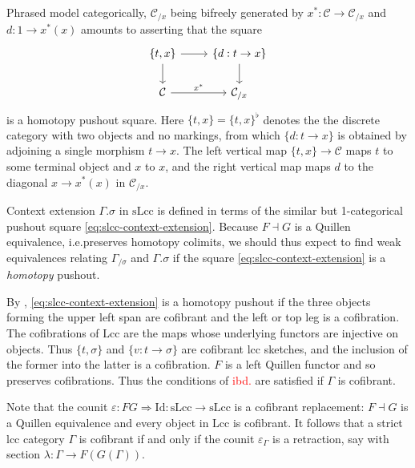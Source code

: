 \documentclass[a4paper]{article}
\newcommand{\todo}[1]{\textcolor{red}{#1}}
\theoremstyle{remark}
\theoremstyle{definition}
\begin{document}
Phrased model categorically, $\mathcal{C}_{/ x}$ being bifreely generated by $x^* : \mathcal{C} \rightarrow \mathcal{C}_{/ x}$ and $d : 1 \rightarrow x^*(x)$ amounts to asserting that the square
\begin{equation}
  \label{eq:homotopy-pushout-lcc}
  \begin{tikzcd}
    \{ t, x \} \arrow[r] \arrow[d] & \{ d : t \rightarrow x \} \arrow[d] \\
    \mathcal{C} \arrow[r, "x^*"] & \mathcal{C}_{/ x}
  \end{tikzcd}
\end{equation}
is a homotopy pushout square.
Here $\{t, x\} = \{t, x\}^\flat$ denotes the the discrete category with two objects and no markings, from which $\{d : t \rightarrow x\}$ is obtained by adjoining a single morphism $t \rightarrow x$.
The left vertical map $\{ t, x \} \rightarrow \mathcal{C}$ maps $t$ to some terminal object and $x$ to $x$, and the right vertical map maps $d$ to the diagonal $x \rightarrow x^*(x)$ in $\mathcal{C}_{/ x}$.

Context extension $\Gamma.\sigma$ in $\mathrm{sLcc}$ is defined in terms of the similar but 1-categorical pushout square \eqref{eq:slcc-context-extension}.
Because $F \dashv G$ is a Quillen equivalence, i.e.\@ preserves homotopy colimits, we should thus expect to find weak equivalences relating $\Gamma_{/ \sigma}$ and $\Gamma.\sigma$ if the square \eqref{eq:slcc-context-extension} is a \emph{homotopy} pushout.

By \cite[Proposition A.2.4.4]{higher-topos-theory}, \eqref{eq:slcc-context-extension} is a homotopy pushout if the three objects forming the upper left span are cofibrant and the left or top leg is a cofibration.
The cofibrations of $\mathrm{Lcc}$ are the maps whose underlying functors are injective on objects.
Thus $\{t, \sigma\}$ and $\{ v : t \rightarrow \sigma\}$ are cofibrant lcc sketches, and the inclusion of the former into the latter is a cofibration.
$F$ is a left Quillen functor and so preserves cofibrations.
Thus the conditions of \todo{ibd.} are satisfied if $\Gamma$ is cofibrant.

Note that the counit $\varepsilon : FG \Rightarrow \mathrm{Id} : \mathrm{sLcc} \rightarrow \mathrm{sLcc}$ is a cofibrant replacement: $F \dashv G$ is a Quillen equivalence and every object in $\mathrm{Lcc}$ is cofibrant.
It follows that a strict lcc category $\Gamma$ is cofibrant if and only if the counit $\varepsilon_\Gamma$ is a retraction, say with section $\lambda : \Gamma \rightarrow F(G(\Gamma))$.
\end{document}
